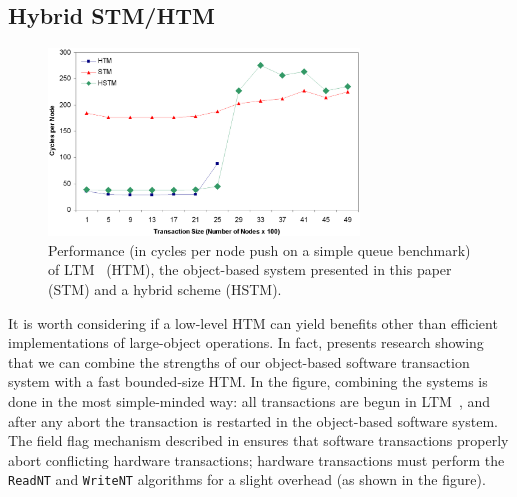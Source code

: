 \subsection{Hybrid STM/HTM}\label{sec:hybrid}
\begin{figure}[t]\begin{center}%
\includegraphics[width=3.25in,clip=true]{Figures/sean_lie_6b.eps}%
\end{center}%
\caption{Performance (in cycles per node push on a simple queue
  benchmark) of LTM~\cite{AnanianAsKuLeLi04} (HTM), the
  object-based system presented in this paper (STM) and a hybrid
  scheme (HSTM).}%
\label{fig:hybrid}%
\end{figure}
It is worth considering if a low-level HTM can yield benefits other
than efficient implementations of large-object operations.  In fact,
 presents research showing that we can combine the
strengths of our object-based software transaction system with a
fast bounded-size HTM.  In the figure, combining the systems is done
in the most simple-minded way: all transactions are begun in
LTM~\cite{AnanianAsKuLeLi04},
and after any abort the transaction is restarted in the
object-based software system.  The field flag mechanism described in
 ensures that software transactions properly abort
conflicting hardware transactions; hardware transactions must perform
the \texttt{ReadNT} and \texttt{WriteNT} algorithms for a slight
overhead (as shown in the figure).
